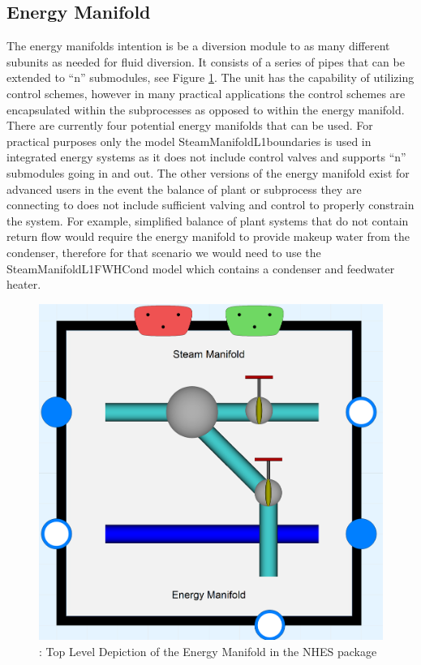 \subsection{Energy Manifold}
The energy manifolds intention is be a diversion module to as many different subunits as needed for fluid diversion. It consists of a series of pipes that can be extended to “n” submodules, see Figure \ref{Top View Energy Manifold}. The unit has the capability of utilizing control schemes, however in many practical applications the control schemes are encapsulated within the subprocesses as opposed to within the energy manifold. There are currently four potential energy manifolds that can be used. For practical purposes only the model SteamManifold\textunderscore L1\textunderscore boundaries is used in integrated energy systems as it does not include control valves and supports “n” submodules going in and out. The other versions of the energy manifold exist for advanced users in the event the balance of plant or subprocess they are connecting to does not include sufficient valving and control to properly constrain the system. For example, simplified balance of plant systems that do not contain return flow would require the energy manifold to provide makeup water from the condenser, therefore for that scenario we would need to use the SteamManifold\textunderscore L1\textunderscore FWH\textunderscore Cond model which contains a condenser and feedwater heater.   

\begin{figure}[hbtp]
\centering
\includegraphics[scale=0.15]{pics/Energy_Manifold.png}
\caption{: Top Level Depiction of the Energy Manifold in the NHES package}
\label{Top View Energy Manifold}
\end{figure}





%
